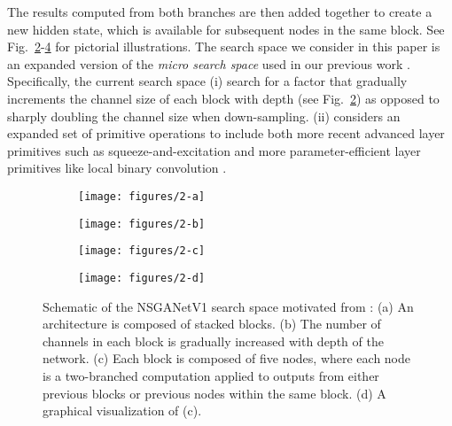 \documentclass[journal]{IEEEtran}
\def\ourmethod{NSGANetV1}
\theoremstyle{definition}
\theoremstyle{remark}
\begin{document}
The results computed from both branches are then added together to create a new hidden state, which is available for subsequent nodes in the same block. See Fig.~\ref{fig:search_space_connection}-\ref{fig:search_space_block_phenome} for pictorial illustrations. {The search space we consider in this paper is an expanded version of the \emph{micro search space} used in our previous work \cite{lu2019nsga}. Specifically, the current search space (i) search for a factor that gradually increments the channel size of each block with depth (see Fig.~\ref{fig:search_space_connection}) as opposed to sharply doubling the channel size when down-sampling. (ii) considers an expanded set of primitive operations to include both more recent advanced layer primitives such as squeeze-and-excitation \cite{hu2018squeeze} and more parameter-efficient layer primitives like local binary convolution \cite{lbcnn}}.

\begin{figure*}[t]
	\centering
	\begin{subfigure}[t]{.22\textwidth}
		\centering
		\texttt{[image: figures/2-a]}
		\caption{\label{fig:search_space_structure}}
	\end{subfigure}
	\begin{subfigure}[t]{.20\textwidth}
		\centering
		\texttt{[image: figures/2-b]}
		\caption{\label{fig:search_space_connection}}
	\end{subfigure}
	\begin{subfigure}[t]{.33\textwidth}
		\centering
		\texttt{[image: figures/2-c]}
		\caption{\label{fig:search_space_block}}
	\end{subfigure}
	\begin{subfigure}[t]{.23\textwidth}
		\centering
		\texttt{[image: figures/2-d]}
		\caption{\label{fig:search_space_block_phenome}}
	\end{subfigure}
	\caption{Schematic of the \ourmethod{} search space motivated from \cite{nasnet2018}: (a) An architecture is composed of stacked blocks. (b) The number of channels in each block is gradually increased with depth of the network. (c) Each block is composed of five nodes, where each node is a two-branched computation applied to outputs from either previous blocks or previous nodes within the same block. (d) A graphical visualization of (c).\label{fig:search_space}}
	\vspace{-1em}
\end{figure*}
\end{document}
